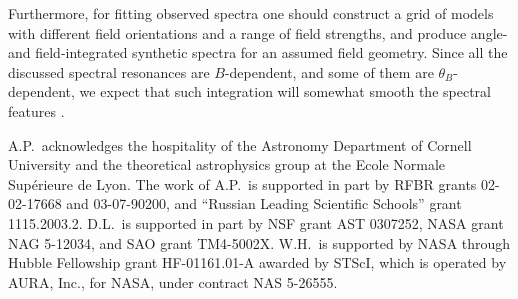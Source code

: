 \documentclass{emulateapj}
\begin{document}
Furthermore, for fitting observed spectra one should 
construct a grid of models with different field orientations
and a range of field strengths,
and produce angle- and field-integrated synthetic spectra
for an assumed field geometry. Since all
the discussed spectral resonances are
$B$-dependent, and some of them are $\theta_B$-dependent,
we expect that such integration will somewhat smooth
the spectral features \citep{HoLai04}.


\acknowledgements
A.P.\ acknowledges the hospitality
of the Astronomy Department of Cornell University
and the theoretical astrophysics group 
at the Ecole Normale Sup\'erieure de Lyon.
The work of A.P.\ is supported in part by RFBR grants 
02-02-17668 and 03-07-90200, 
and ``Russian Leading Scientific Schools''
grant 1115.2003.2. 
D.L.\ is supported in part by NSF grant AST 0307252,
NASA grant NAG 5-12034,
and SAO grant TM4-5002X.
W.H.\ is supported by NASA through Hubble Fellowship grant
HF-01161.01-A awarded by STScI, which is operated by AURA, Inc.,
for NASA, under contract NAS 5-26555.

\appendix
\end{document}
